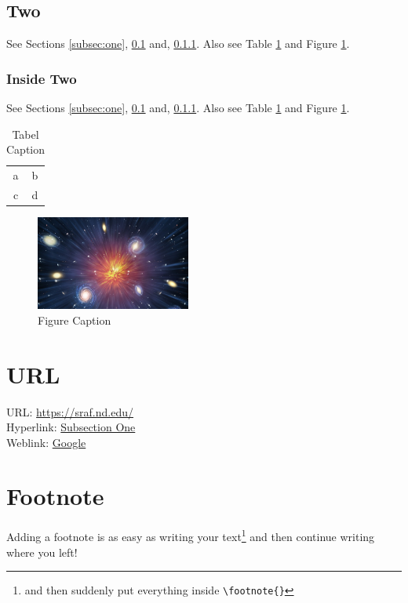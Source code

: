 \documentclass[12pt,twoside,a4paper]{article}
\begin{document}
\subsection{Two}
\label{subsec:two}
See Sections \ref{subsec:one}, \ref{subsec:two} and, \ref{subsubsec:inside-two}. Also see Table \ref{tab:my_label} and Figure \ref{fig:my_label}.

\subsubsection{Inside Two}
\label{subsubsec:inside-two}
See Sections \ref{subsec:one}, \ref{subsec:two} and, \ref{subsubsec:inside-two}. Also see Table \ref{tab:my_label} and Figure \ref{fig:my_label}.


\begin{table}[ht]
    \centering
    \begin{tabular}{|c|c|}
        a & b  \\
        c & d
    \end{tabular}
    \caption{Tabel Caption}
    \label{tab:my_label}
\end{table}

\begin{figure}[ht]
    \centering
    \includegraphics[width=2in]{universe.jpg}
    \caption{Figure Caption}
    \label{fig:my_label}
\end{figure}





\section{URL}
URL:       \url{https://sraf.nd.edu/}\\
Hyperlink: \hyperref[subsec:one]{Subsection One}\\
Weblink:   \href{https://www.google.com}{Google}\\





\section{Footnote}
Adding a footnote is as easy as writing your text\footnote{and then suddenly put everything inside \texttt{\textbackslash footnote\{\}}} and then continue writing where you left!
\end{document}
